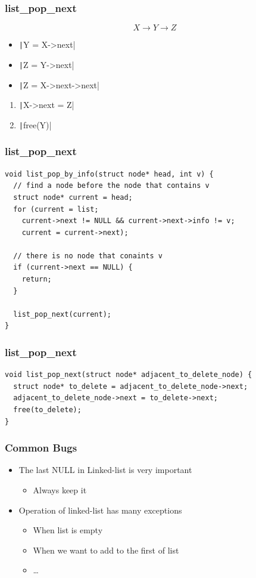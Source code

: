 \documentclass{../c-lecture}
\begin{document}
\begin{frame}[fragile]
  \frametitle{list\_pop\_next}
  \[X \rightarrow Y \rightarrow Z\]
  \begin{itemize}
    \item \texttt|Y = X->next|
    \item \texttt|Z = Y->next|
    \item \texttt|Z = X->next->next|
  \end{itemize}
  \begin{enumerate}
    \item \texttt|X->next = Z|
    \item \texttt|free(Y)|
  \end{enumerate}
\end{frame}
\begin{frame}[fragile]
  \frametitle{list\_pop\_next}
  \scriptsize
  \begin{verbatim}
void list_pop_by_info(struct node* head, int v) {
  // find a node before the node that contains v
  struct node* current = head;
  for (current = list;
    current->next != NULL && current->next->info != v;
    current = current->next);

  // there is no node that conaints v
  if (current->next == NULL) {
    return;
  }

  list_pop_next(current);
}
  \end{verbatim}
\end{frame}
\begin{frame}[fragile]
  \frametitle{list\_pop\_next}
  \begin{verbatim}
void list_pop_next(struct node* adjacent_to_delete_node) {
  struct node* to_delete = adjacent_to_delete_node->next;
  adjacent_to_delete_node->next = to_delete->next;
  free(to_delete);
}
  \end{verbatim}
\end{frame}

\begin{frame}
  \frametitle{Common Bugs}
  \begin{itemize}
    \item
      The last \textsc{\color{YellowOrange} NULL} in Linked-list is very
      important

    \begin{itemize}
      \item Always keep it
    \end{itemize}
    \item Operation of linked-list has many exceptions
    \begin{itemize}
      \item When list is empty
      \item When we want to add to the first of list
      \item \ldots
    \end{itemize}
  \end{itemize}
\end{frame}
\end{document}
